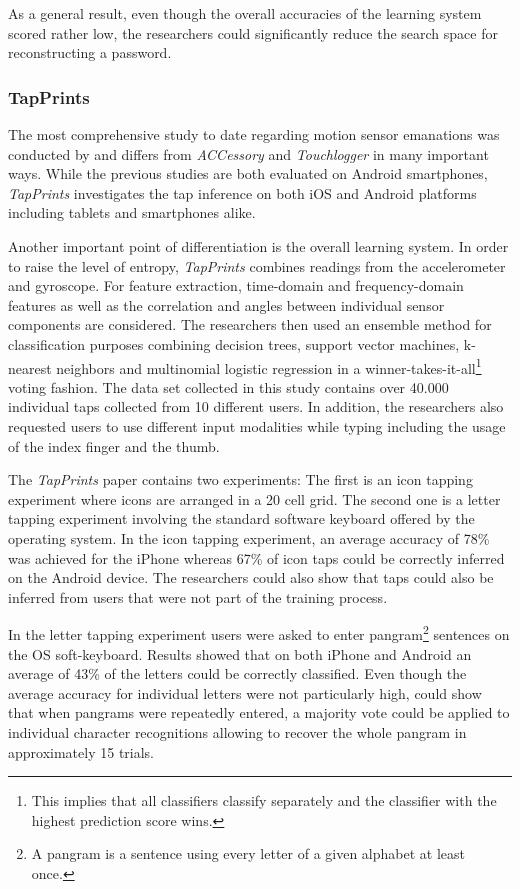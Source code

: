 As a general result, even though the overall accuracies of the learning system scored rather low, the researchers could significantly reduce the search space for reconstructing a password.

\subsubsection{TapPrints}

The most comprehensive study to date regarding motion sensor emanations was conducted by \citeauthor{Tapprints} and differs from \textit{ACCessory} and \textit{Touchlogger} in many important ways. While the previous studies are both evaluated on Android smartphones, \textit{TapPrints} investigates the tap inference on both iOS and Android platforms including tablets and smartphones alike. 

Another important point of differentiation is the overall learning system. In order to raise the level of entropy, \textit{TapPrints} combines readings from the accelerometer and gyroscope. For feature extraction, time-domain and frequency-domain features as well as the correlation and angles between individual sensor components are considered. The researchers then used an ensemble method for classification purposes combining decision trees, support vector machines, k-nearest neighbors and multinomial logistic regression in a winner-takes-it-all\footnote{This implies that all classifiers classify separately and the classifier with the highest prediction score wins.} voting fashion. The data set collected in this study contains over 40.000 individual taps collected from 10 different users. In addition, the researchers also requested users to use different input modalities while typing including the usage of the index finger and the thumb.

The \textit{TapPrints} paper contains two experiments: The first is an icon tapping experiment where icons are arranged in a 20 cell grid. The second one is a letter tapping experiment involving the standard software keyboard offered by the operating system. In the icon tapping experiment, an average accuracy of 78\% was achieved for the iPhone whereas 67\% of icon taps could be correctly inferred on the Android device. The researchers could also show that taps could also be inferred from users that were not part of the training process.

In the letter tapping experiment users were asked to enter pangram\footnote{A pangram is a sentence using every letter of a given alphabet at least once.} sentences on the OS soft-keyboard. Results showed that on both iPhone and Android an average of 43\% of the letters could be correctly classified. Even though the average accuracy for individual letters were not particularly high, \citeauthor{Tapprints} could show that when pangrams were repeatedly entered, a majority vote could be applied to individual character recognitions allowing to recover the whole pangram in approximately 15 trials. 


